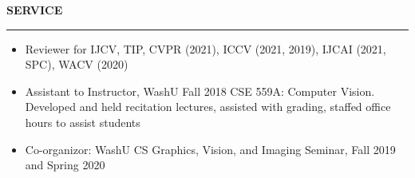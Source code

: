 \documentclass{resume} %
\begin{document}
  \sectionskip
  \MakeUppercase{\bf Service} %
  \sectionlineskip
  \hrule %

  \begin{itemize}
  \item Reviewer for IJCV, TIP, CVPR (2021), ICCV (2021, 2019), IJCAI (2021, SPC), WACV (2020)\\
  \vspace{-1em}
  \item Assistant to Instructor, WashU Fall 2018 CSE 559A: Computer Vision. Developed and held recitation lectures, assisted with grading, staffed office hours to assist students\\
  \vspace{-1em}
  \item Co-organizor: WashU CS Graphics, Vision, and Imaging Seminar, Fall 2019 and Spring 2020
  \end{itemize}









  
\end{document}
